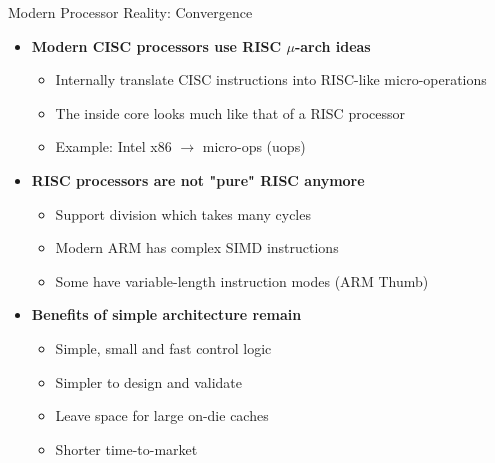 \documentclass[aspectratio=169,12pt]{beamer}
\begin{document}
\begin{frame}{Modern Processor Reality: Convergence}
\begin{itemize}
    \item \textbf{Modern CISC processors use RISC $\mu$-arch ideas}
    \begin{itemize}
        \item Internally translate CISC instructions into RISC-like micro-operations
        \item The inside core looks much like that of a RISC processor
        \item Example: Intel x86 $\rightarrow$ micro-ops (uops)
    \end{itemize}
    \vspace{0.5cm}
    \item \textbf{RISC processors are not "pure" RISC anymore}
    \begin{itemize}
        \item Support division which takes many cycles
        \item Modern ARM has complex SIMD instructions
        \item Some have variable-length instruction modes (ARM Thumb)
    \end{itemize}
    \vspace{0.5cm}
    \item \textbf{Benefits of simple architecture remain}
    \begin{itemize}
        \item Simple, small and fast control logic
        \item Simpler to design and validate
        \item Leave space for large on-die caches
        \item Shorter time-to-market
    \end{itemize}
\end{itemize}
\end{frame}
\end{document}
